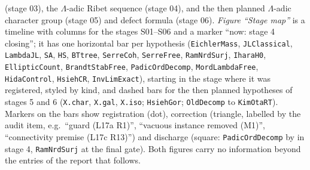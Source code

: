 (stage 03), the $\Lambda$-adic Ribet sequence (stage 04), and the then planned $\Lambda$-adic character group (stage 05) and defect
formula (stage 06). \emph{Figure ``Stage map''} is a timeline with columns for the stages S01--S06 and a marker ``now: stage 4 closing''; it
has one horizontal bar per hypothesis (\texttt{EichlerMass}, \texttt{JLClassical}, \texttt{LambdaJL}, \texttt{SA}, \texttt{HS},
\texttt{BTtree}, \texttt{SerreCoh}, \texttt{SerreFree}, \texttt{RamNrdSurj}, \texttt{IharaH0}, \texttt{EllipticCount},
\texttt{BrandtStabFree}, \texttt{PadicOrdDecomp}, \texttt{MordLambdaFree}, \texttt{HidaControl}, \texttt{HsiehCR},
\texttt{InvLimExact}), starting in the stage where it was registered, styled by kind, and dashed bars for the then planned
hypotheses of stages 5 and 6 (\texttt{X.char}, \texttt{X.gal}, \texttt{X.iso}; \texttt{HsiehGor}; \texttt{OldDecomp} to
\texttt{KimOtaRT}). Markers on the bars show registration (dot), correction (triangle, labelled by the audit item, e.g.\
``guard (L17a R1)'', ``vacuous instance removed (M1)'', ``connectivity premise (L17c R13)'') and discharge (square:
\texttt{PadicOrdDecomp} by \pathtt{padicOrdDecomp\_holds} in stage 4, \texttt{RamNrdSurj} at the final gate).
Both figures carry no information beyond the entries of the report that follows.


